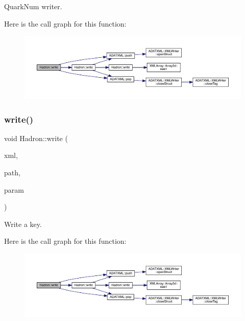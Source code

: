 Quark\+Num writer. 

Here is the call graph for this function\+:
\nopagebreak
\begin{figure}[H]
\begin{center}
\leavevmode
\includegraphics[width=350pt]{d1/daf/namespaceHadron_a7da51caa70247c9ab9d11f8275ec93b7_cgraph}
\end{center}
\end{figure}
\mbox{\label{namespaceHadron_a2454ead756c8c4f2b1f75bbf8d3c1070}} 
\subsubsection{\texorpdfstring{write()}{write()}\hspace{0.1cm}{\footnotesize\ttfamily [6/95]}}
{\footnotesize\ttfamily void Hadron\+::write (\begin{DoxyParamCaption}\item[{\mbox{\hyperlink{classADATXML_1_1XMLWriter}{X\+M\+L\+Writer}} \&}]{xml,  }\item[{const std\+::string \&}]{path,  }\item[{const \mbox{\hyperlink{structHadron_1_1KeyCGCIrrepMom__t}{Key\+C\+G\+C\+Irrep\+Mom\+\_\+t}} \&}]{param }\end{DoxyParamCaption})}



Write a key. 

Here is the call graph for this function\+:
\nopagebreak
\begin{figure}[H]
\begin{center}
\leavevmode
\includegraphics[width=350pt]{d1/daf/namespaceHadron_a2454ead756c8c4f2b1f75bbf8d3c1070_cgraph}
\end{center}
\end{figure}
\mbox{\label{namespaceHadron_ae327bbb04efa053f7be135b73bb596a7}} 
